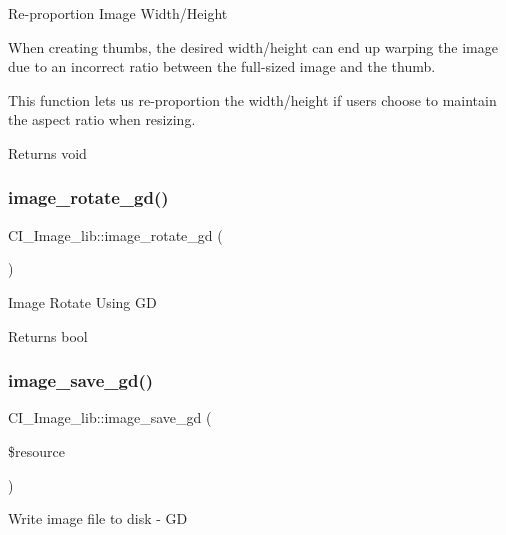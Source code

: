 Re-\/proportion Image Width/\+Height

When creating thumbs, the desired width/height can end up warping the image due to an incorrect ratio between the full-\/sized image and the thumb.

This function lets us re-\/proportion the width/height if users choose to maintain the aspect ratio when resizing.

\begin{DoxyReturn}{Returns}
void 
\end{DoxyReturn}
\mbox{\label{class_c_i___image__lib_a1088a0cad2b9439e333321f7d0d287ca}} 
\subsubsection{\texorpdfstring{image\+\_\+rotate\+\_\+gd()}{image\_rotate\_gd()}}
{\footnotesize\ttfamily C\+I\+\_\+\+Image\+\_\+lib\+::image\+\_\+rotate\+\_\+gd (\begin{DoxyParamCaption}{ }\end{DoxyParamCaption})}

Image Rotate Using GD

\begin{DoxyReturn}{Returns}
bool 
\end{DoxyReturn}
\mbox{\label{class_c_i___image__lib_aec1398a78345d74eaddc963763400d94}} 
\subsubsection{\texorpdfstring{image\+\_\+save\+\_\+gd()}{image\_save\_gd()}}
{\footnotesize\ttfamily C\+I\+\_\+\+Image\+\_\+lib\+::image\+\_\+save\+\_\+gd (\begin{DoxyParamCaption}\item[{}]{\$resource }\end{DoxyParamCaption})}

Write image file to disk -\/ GD

